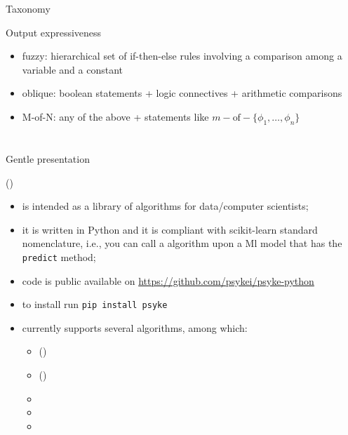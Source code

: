 \documentclass[presentation]{beamer}\mode<presentation>{\usetheme{AMSBolognaFC}}
\begin{document}
\begin{frame}[allowframebreaks]{Taxonomy}
\begin{block}{Output expressiveness}
\begin{itemize}
            \item fuzzy: hierarchical set of if-then-else rules involving a comparison among a variable and a constant   
            \item oblique: boolean statements + logic connectives + arithmetic comparisons
            \item M-of-N: any of the above + statements like $m-\text{of}-\{\phi_1, \ldots, \phi_n \}$
        \end{itemize} 
        
    \end{block}
\end{frame}


\section{\longpsyke}

\begin{frame}[c]{Gentle presentation}
    \begin{block}{\longpsyke{} (\psyke) }
        \begin{itemize}
            \item \psyki is intended as a library of \ske{} algorithms for data/computer scientists;
            \item it is written in Python and it is compliant with scikit-learn standard nomenclature, i.e., you can call a \ske{} algorithm upon a Ml model that has the \texttt{predict} method;
            \item code is public available on \href{https://github.com/psykei/psyke-python}{https://github.com/psykei/psyke-python}
            \item to install run \texttt{pip install psyke}
            \item currently \psyke{} supports several \ski{} algorithms, among which:
            \begin{itemize}
                \item \longcart{} (\cart) 
                \item \longreal{} (\real) 
                \item \trepan{} 
                \item \iter{} 
                \item \gridex{} 
            \end{itemize}
        \end{itemize}
    \end{block}
\end{frame}
\end{document}
